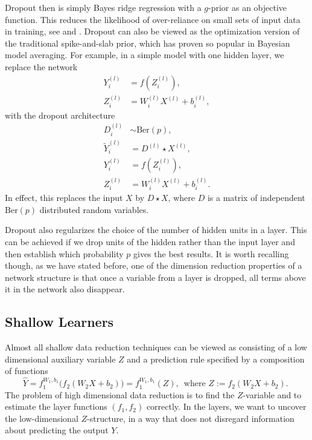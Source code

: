 \documentclass[12pt]{article}
\begin{document}
Dropout then is simply  Bayes ridge regression with a $g$-prior as an objective function. This reduces the likelihood of over-reliance on small sets of input data in training,
see \cite{hinton_reducing_2006} and \cite{srivastava_dropout:_2014}. Dropout can also be viewed as the optimization version of the traditional spike-and-slab prior, which has proven so popular in Bayesian model averaging. For example, in a simple model with one hidden layer, we replace the network
\begin{align*}
Y_i^{(l)} & =  f ( Z_i^{(l)} ), \\
Z_i^{(l)} & = W_i^{(l)} X^{(l)}  + b_i^{(l)},
\end{align*}
with the dropout architecture
\begin{align*}
D_i^{(l)} & \sim \text{Ber} (p), \\
\tilde{Y}_i^{(l)} & = D^{(l)} \star X^{(l)}, \\
Y_i^{(l)} & =  f ( Z_i^{(l)} ), \\
Z_i^{(l)} & = W_i^{(l)} X^{(l)}  + b_i^{(l)}.
\end{align*}
In effect, this replaces the input $X$ by $ D \star X $, where $D$ is a matrix of independent  $\text{Ber}(p)$ distributed random variables. 

Dropout also regularizes the choice of the number of hidden units in a layer. This can be achieved if we drop units of the hidden rather than the input layer and then establish which probability $p$ gives the best results. It is worth recalling though, as we have stated before, one of the dimension reduction properties of a network structure
is that once a variable from a layer is dropped, all terms above it in the network also disappear. 


\subsection{Shallow Learners}

Almost all shallow data reduction techniques can be viewed as consisting of a low dimensional auxiliary
variable $Z$ and a prediction rule specified by a
composition of functions 
\[
\hat{Y} = f_1^{W_1,b_1} (f_2( W_2X +b_2)\big) 
= f_1^{W_1,b_1}(Z),\,\text{ where $Z:=f_2(W_2X+b_2)$. }
\]
The problem of high dimensional data reduction is to find the $Z$-variable and to estimate the layer functions $(f_1, f_2)$ correctly. In the layers, we want to uncover the low-dimensional $Z$-structure, in a way that does not disregard information about predicting the output $Y$.
\end{document}
